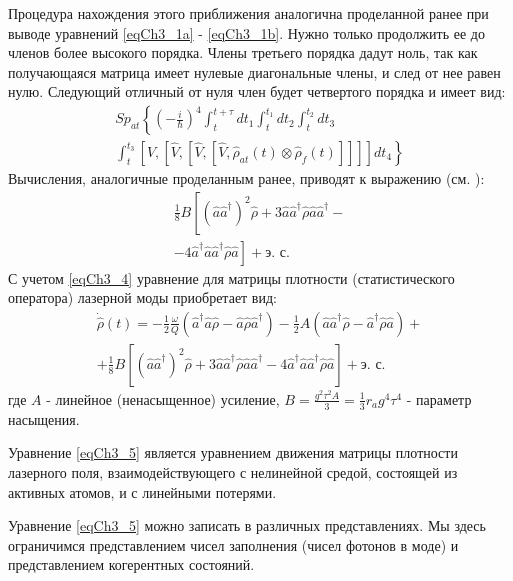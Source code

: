 Процедура нахождения этого приближения аналогична проделанной ранее
при выводе уравнений \eqref{eqCh3_1a} - \ref{eqCh3_1b}. Нужно только
продолжить ее до членов более высокого порядка. Члены третьего порядка
дадут ноль, так как получающаяся матрица имеет нулевые диагональные
члены, и след от нее равен нулю. Следующий отличный от нуля член будет 
четвертого порядка и имеет вид: 
\begin{eqnarray}
Sp_{at}\left\{
\left(-\frac{i}{\hbar}\right)^4
\int_t^{t+\tau}dt_1
\int_t^{t_1}dt_2
\int_t^{t_2}dt_3
\right.
\nonumber \\
\left.
\int_t^{t_3}
\left[\hat{V},
\left[\hat{V},
\left[\hat{V},
\left[\hat{V},
\hat{\rho}_{at}\left(t\right)
\otimes
\hat{\rho}_{f}\left(t\right)
\right]
\right]
\right]
\right]
dt_4
\right\}
\label{eqCh3_3}
\end{eqnarray}
Вычисления, аналогичные проделанным ранее, приводят к выражению
(см. \cite{bMandel2000}):
\begin{eqnarray}
\frac{1}{8}B\left[
\left(\hat{a} \hat{a}^{\dag}\right)^2\hat{\rho}
+ 3 \hat{a} \hat{a}^{\dag} \hat{\rho} \hat{a} \hat{a}^{\dag} -
\right.
\nonumber \\
\left.
-
4 \hat{a}^{\dag} \hat{a} \hat{a}^{\dag} \hat{\rho} \hat{a}
\right] + \mbox{э. с.}
\label{eqCh3_4}
\end{eqnarray}
С учетом \eqref{eqCh3_4} уравнение для матрицы плотности
(статистического оператора) лазерной моды приобретает вид: 
\begin{eqnarray}
\dot{\hat{\rho}}\left(t\right) = 
- \frac{1}{2}\frac{\omega}{Q}
\left(\hat{a}^{\dag}\hat{a}\hat{\rho} - 
\hat{a}\hat{\rho}\hat{a}^{\dag}
\right)
- \frac{1}{2}A
\left(\hat{a}\hat{a}^{\dag}\hat{\rho} - 
\hat{a}^{\dag}\hat{\rho}\hat{a}
\right) + 
\nonumber \\
+ \frac{1}{8}B\left[
\left(\hat{a} \hat{a}^{\dag}\right)^2\hat{\rho}
+ 3 \hat{a} \hat{a}^{\dag} \hat{\rho} \hat{a} \hat{a}^{\dag} -
4 \hat{a}^{\dag} \hat{a} \hat{a}^{\dag} \hat{\rho} \hat{a}
\right] + \mbox{э. с.}
\label{eqCh3_5}
\end{eqnarray}
где $A$ - линейное (ненасыщенное) усиление, 
$B=\frac{g^2 \tau^2 A}{3} = \frac{1}{3}r_ag^4\tau^4$ - параметр
насыщения.

Уравнение \eqref{eqCh3_5} является уравнением движения матрицы
плотности лазерного поля, взаимодействующего с нелинейной средой,
состоящей из активных атомов, и с линейными потерями. 

Уравнение \eqref{eqCh3_5} можно записать в различных
представлениях. Мы здесь ограничимся представлением чисел заполнения
(чисел фотонов в моде) и представлением когерентных состояний. 

